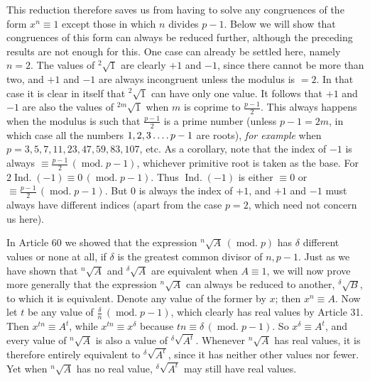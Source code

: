 This reduction therefore saves us from having to solve any congruences of the form $x^n\equiv1$ except those in which $n$ divides $p-1$. Below we will show that congruences of this form can always be reduced further, although the preceding results are not enough for this. One case can already be settled here, namely $n=2$. The values of ${}^{2}\!\surd {1}$ are clearly $+1$ and $-1$, since there cannot be more than two, and $+1$ and $-1$ are always incongruent unless the modulus is $=2$. In that case it is clear in itself that ${}^{2}\!\surd {1}$ can have only one value. It follows that $+1$ and $-1$ are also the values of ${}^{2m}\!\surd {1}$ when $m$ is coprime to $\frac{p-1}{2}$. This always happens when the modulus is such that $\frac{p-1}{2}$ is a prime number (unless $p-1=2m$, in which case all the numbers $1,2,3\mathinner{\ldotp\ldotp\ldotp\ldotp} p-1$ are roots), \emph{for example} when $p=3,5,7,11,23,47,59,83,107$, etc. As a corollary, note that the index of $-1$ is always $\equiv\frac{p-1}{2}\,(\operatorname{mod.}p-1)$, whichever primitive root is taken as the base. For $2\operatorname{Ind.}(-1)\equiv0\,(\operatorname{mod.}p-1)$. Thus $\operatorname{Ind.}(-1)$ is either $\equiv0$ or $\equiv\frac{p-1}{2}\,(\operatorname{mod.}p-1)$. But $0$ is always the index of $+1$, and $+1$ and $-1$ must always have different indices (apart from the case $p=2$, which need not concern us here).

In Article 60 we showed that the expression ${}^{n}\!\surd {A}\,(\operatorname{mod.}p)$ has $\delta$ different values or none at all, if $\delta$ is the greatest common divisor of $n,p-1$. Just as we have shown that ${}^{n}\!\surd {A}$ and ${}^{\delta}\!\surd {A}$ are equivalent when $A\equiv1$, we will now prove more generally that the expression ${}^{n}\!\surd {A}$ can always be reduced to another, ${}^{\delta}\!\surd {B}$, to which it is equivalent. Denote any value of the former by $x$; then $x^n\equiv A$. Now
let $t$ be any value of $\frac{\delta}{n}\,(\operatorname{mod.}p-1)$, which clearly has real values by Article 31. Then $x^{tn}\equiv A^t$, while $x^{tn}\equiv x^\delta$ because $tn\equiv\delta\,(\operatorname{mod.}p-1)$. So $x^\delta\equiv A^t$, and every value of ${}^{n}\!\surd {A}$ is also a value of ${}^{\delta}\!\surd {A^t}$. Whenever ${}^{n}\!\surd {A}$ has real values, it is therefore entirely equivalent to ${}^{\delta}\!\surd {A^t}$, since it has neither other values nor fewer. Yet when ${}^{n}\!\surd {A}$ has no real value, ${}^{\delta}\!\surd {A^t}$ may still have real values.

